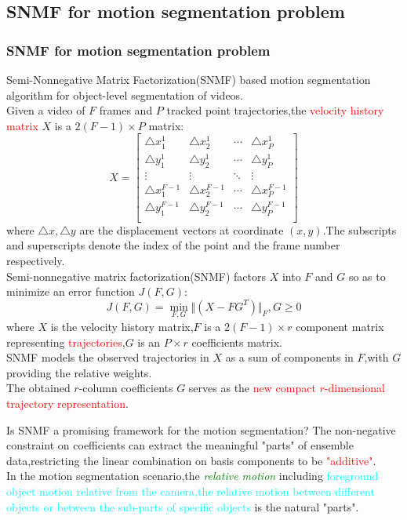 \documentclass{beamer}
\begin{document}
\subsection{SNMF for motion segmentation problem}
\begin{frame}[allowframebreaks]\frametitle{SNMF for motion segmentation problem}
Semi-Nonnegative Matrix Factorization(SNMF) based motion segmentation algorithm for object-level segmentation of videos.\\
Given a video of $F$ frames and $P$ tracked point trajectories,the \textcolor{red}{velocity history matrix} $X$ is a $2(F-1)\times P$ matrix:
\begin{equation}
X=\left[
          \begin{array}{cccc}
            \triangle x_1^1 & \triangle x_2^1 & \cdots & \triangle x_P^1 \\
            \triangle y_1^1 & \triangle y_2^1 & \cdots & \triangle y_P^1 \\
            \vdots & \vdots & \ddots & \vdots \\
            \triangle x_1^{F-1} & \triangle x_2^{F-1} & \cdots & \triangle x_P^{F-1} \\
            \triangle y_1^{F-1} & \triangle y_2^{F-1} & \cdots & \triangle y_P^{F-1} \\
          \end{array}
        \right]
\end{equation}
where $\triangle x,\triangle y$ are the displacement vectors at coordinate $(x,y)$.The subscripts and superscripts denote the index of the point and the frame number respectively.\\
Semi-nonnegative matrix factorization(SNMF) factors $X$ into $F$ and $G$ so as to minimize an error function $J(F,G)$:
\begin{equation}
J(F,G)=\min_{F,G}\Vert (X-FG^T)\Vert_F,G\geq 0
\end{equation}
where $X$ is the velocity history matrix,$F$ is a $2(F-1)\times r$ component matrix representing \textcolor{red}{trajectories},$G$ is an $P\times r$ coefficients matrix.\\
\medskip
SNMF models the observed trajectories in $X$ as a sum of components in $F$,with $G$ providing the relative weights.\\
\medskip
The obtained $r$-column coefficients $G$ serves as the \textcolor{red}{new compact $r$-dimensional trajectory representation}.

\begin{block}{Is SNMF a promising framework for the motion segmentation?}
The non-negative constraint on coefficients can extract the meaningful "parts" of ensemble data,restricting the linear combination on basis components to be \textcolor{red}{"additive"}.\\
In the motion segmentation scenario,the \emph{\textcolor{green}{relative motion}} including \textcolor{cyan}{foreground object motion relative from the camera,the relative motion between different objects or between the sub-parts of specific objects} is the natural "parts".
\end{block}


\end{frame}
\end{document}

